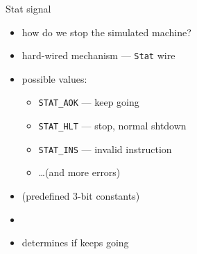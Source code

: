\begin{frame}{Stat signal}
    \begin{itemize}
    \item how do we stop the simulated machine?
    \item hard-wired mechanism --- {\tt Stat} wire
    \item possible values:
        \begin{itemize}
        \item {\tt STAT\_AOK} --- keep going
        \item {\tt STAT\_HLT} --- stop, normal shtdown
        \item {\tt STAT\_INS} --- invalid instruction
        \item \ldots (and more errors)
        \end{itemize}
    \item (predefined 3-bit constants)
    \item {}
    \item determines if  keeps going
    \end{itemize}
\end{frame}
